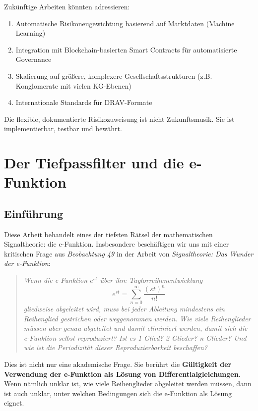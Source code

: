 \documentclass[a4paper, 12pt, twoside, openright]{report}
\theoremstyle{definition}
\theoremstyle{definition}
\begin{document}
Zukünftige Arbeiten könnten adressieren:
\begin{enumerate}
    \item Automatische Risikoneugewichtung basierend auf Marktdaten (Machine Learning)
    \item Integration mit Blockchain-basierten Smart Contracts für automatisierte Governance
    \item Skalierung auf größere, komplexere Gesellschaftsstrukturen (z.B. Konglomerate mit vielen KG-Ebenen)
    \item Internationale Standards für DRAV-Formate
\end{enumerate}

Die flexible, dokumentierte Risikozuweisung ist nicht Zukunftsmusik. Sie ist implementierbar, testbar und bewährt.

\cleardoublepage

\chapter{Der Tiefpassfilter und die e-Funktion}
\label{ch:e-function}

\section{Einführung}
Diese Arbeit behandelt eines der tiefsten Rätsel der mathematischen Signaltheorie: die e-Funktion. Insbesondere beschäftigen wir uns mit einer kritischen Frage aus \textit{Beobachtung 49} in der Arbeit von \cite{epp_signal} \textit{Signaltheorie: Das Wunder der e-Funktion}:

\begin{quote}
	\textit{Wenn die e-Funktion $e^{st}$ über ihre Taylorreihenentwicklung 
	$$e^{st} = \sum_{n=0}^{\infty} \frac{(st)^n}{n!}$$
	gliedweise abgeleitet wird, muss bei jeder Ableitung mindestens ein Reihenglied gestrichen oder weggenommen werden. Wie viele Reihenglieder müssen aber genau abgeleitet und damit eliminiert werden, damit sich die e-Funktion selbst reproduziert? Ist es 1 Glied? 2 Glieder? n Glieder? Und wie ist die Periodizität dieser Reproduzierbarkeit beschaffen?}
\end{quote}

Dies ist nicht nur eine akademische Frage. Sie berührt die \textbf{Gültigkeit der Verwendung der e-Funktion als Lösung von Differentialgleichungen}. Wenn nämlich unklar ist, wie viele Reihenglieder abgeleitet werden müssen, dann ist auch unklar, unter welchen Bedingungen sich die e-Funktion als Lösung eignet.
\end{document}
